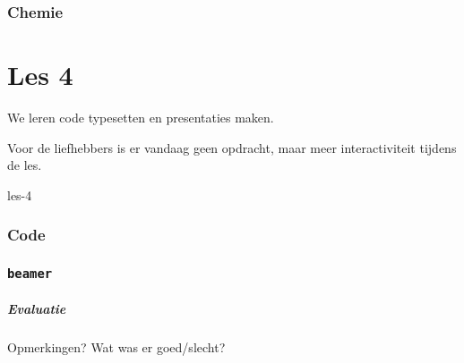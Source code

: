 \documentclass{beamer}
\begin{document}
\section{Chemie}



\part{Les 4}
\lecture
{We leren code typesetten en presentaties maken.

Voor de liefhebbers is er vandaag geen opdracht, maar meer interactiviteit tijdens de les.}
{les-4}
\section{Code}

\section{\texttt{beamer}}


\begin{frame}
  \frametitle{Evaluatie}

  Opmerkingen? Wat was er goed/slecht?
\end{frame}
\end{document}
